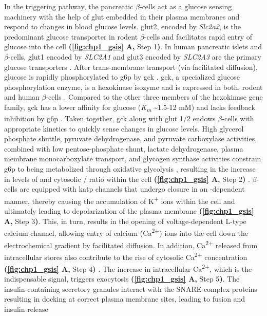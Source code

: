 
\par In the triggering pathway, the pancreatic $\beta$-cells act as a glucose sensing machinery with the help of \gls{glut} embedded in their plasma membranes and respond to changes in blood glucose levels. \gls{glut}2, encoded by \textit{Slc2a2}, is the predominant glucose transporter in rodent $\beta$-cells \textbf{\cite{mcculloch_glut2_2011,van_de_bunt_tale_2012}} and facilitates rapid entry of glucose into the cell \textbf{(\autoref{fig:chp1_gsis} A,} Step 1\textbf{)}. In human pancreatic islets and $\beta$-cells, \gls{glut}1 encoded by \textit{SLC2A1} and \gls{glut}3 encoded by \textit{SLC2A3} are the primary glucose transporters \textbf{\cite{mcculloch_glut2_2011}}. After trans-membrane transport (via facilitated diffusion), glucose is rapidly phosphorylated to \gls{g6p} by \gls{gck} \textbf{\cite{campbell_mechanisms_2021,matschinsky_central_2019}}. \gls{gck}, a specialized glucose phosphorylation enzyme, is a hexokinase isozyme and is expressed in both, rodent and human $\beta$-cells \textbf{\cite{campbell_mechanisms_2021}}. Compared to the other three members of the hexokinase gene family, \gls{gck} has a lower affinity for glucose (\textit{K\textsubscript{m}} \textasciitilde 1.5-12 mM) and lacks feedback inhibition by \gls{g6p} \textbf{\cite{matschinsky_central_2019}}. Taken together, \gls{gck} along with \gls{glut} 1/2 endows $\beta$-cells with appropriate kinetics to quickly sense changes in glucose levels. High glycerol phosphate shuttle, pyruvate dehydrogenase, and pyruvate carboxylase activities, combined with low pentose-phosphate shunt, lactate dehydrogenase, plasma membrane monocarboxylate transport, and glycogen synthase activities constrain \gls{g6p} to being metabolized through oxidative glycolysis \textbf{\cite{matschinsky_central_2019}}, resulting in the increase in levels of  and cytosolic  /  ratio within the cell \textbf{(\autoref{fig:chp1_gsis} A,} Step 2\textbf{)} \textbf{\cite{henquin_triggering_2000}}. $\beta$-cells are equipped with \gls{katp} channels that undergo closure in an -dependent manner, thereby causing the accumulation of K\textsuperscript{+} ions within the cell and ultimately leading to depolarization of the plasma membrane \textbf{(\autoref{fig:chp1_gsis} A,} Step 3\textbf{)}. This, in turn, results in the opening of voltage-dependent L-type calcium channel, allowing entry of calcium (Ca\textsuperscript{2+}) ions into the cell down the electrochemical gradient by facilitated diffusion. In addition, Ca\textsuperscript{2+} released from intracellular stores also contribute to the rise of cytosolic Ca\textsuperscript{2+} concentration \textbf{(\autoref{fig:chp1_gsis} A,} Step 4\textbf{)} \textbf{\cite{yang_ionic_2014}}. The increase in intracellular Ca\textsuperscript{2+}, which is the indispensable signal, triggers exocytosis \textbf{(\autoref{fig:chp1_gsis} A,} Step 5\textbf{)}. The insulin-containing secretory granules interact with the SNARE-complex proteins resulting in docking at correct plasma membrane sites, leading to fusion and insulin release 